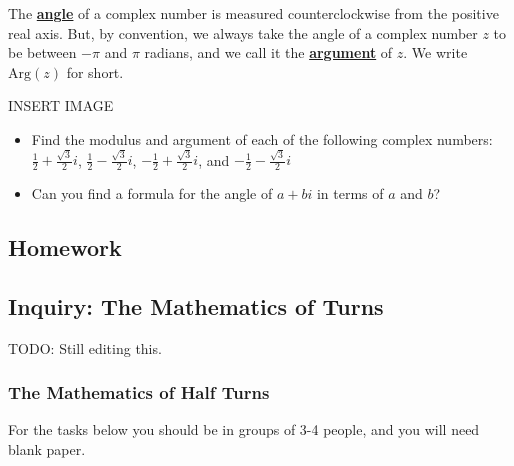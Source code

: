 \documentclass[11pt]{article}
\newenvironment{task}
	{\begin{mdframed}[linecolor=lightgray, linewidth=3pt]\raggedright}
	{\end{mdframed}}
\renewcommand\emph[1]{\underline{\bf{#1}}} %
\theoremstyle{definition}
\begin{document}
The \emph{angle} of a complex number is measured counterclockwise from the positive real axis. But, by convention, we always take the angle
of a complex number $z$ to be between $-\pi$ and $\pi$ radians, and we call it the \emph{argument} of $z$. We write $\text{Arg}(z)$ for short.

\begin{center}
  INSERT IMAGE
\end{center}

\begin{task}
  \begin{itemize}
    \item Find the modulus and argument of each of the following complex numbers: $\frac{1}{2} + \frac{\sqrt{3}}{2}i$, $\frac{1}{2} - \frac{\sqrt{3}}{2}i$, $-\frac{1}{2} + \frac{\sqrt{3}}{2}i$, and $-\frac{1}{2} - \frac{\sqrt{3}}{2}i$
    \item Can you find a formula for the angle of $a+bi$ in terms of $a$ and $b$?
  \end{itemize}
\end{task}

\newpage
\subsection{Homework}

\newpage

\subsection{Inquiry: The Mathematics of Turns}

TODO: Still editing this.

\subsubsection{The Mathematics of Half Turns}

For the tasks below you should be in groups of 3-4 people, and you will need blank paper.
\end{document}
